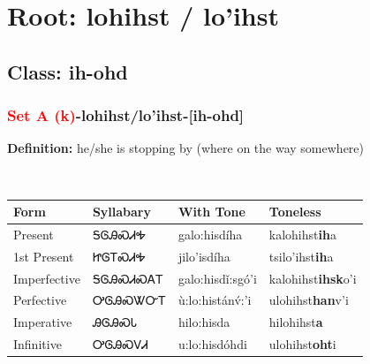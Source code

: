 \needspace{4in}
\section*{Root: lohihst / lo'ihst}
\nopagebreak
{}
\needspace{3in}
\subsection*{Class: ih-ohd}
\nopagebreak
\needspace{2in}
\subsubsection*{\textcolor{Red}{Set A (k)}{-}\textbf{lohihst/lo'ihst}{-}[ih-ohd]}
\nopagebreak
\textbf{Definition: } he/she is stopping by (where on the way somewhere)
\\[0.5em]
\begin{tabularx}{\textwidth}{l X X X}%
\toprule%
\textbf{Form}&\textbf{Syllabary}&\textbf{With Tone}&\textbf{Toneless}\\%
\midrule%
Present&ᎦᎶᎯᏍᏗᎭ&galo:hisdíha&kalohihst\textbf{ih}a\\%
1st Present&ᏥᎶᎢᏍᏗᎭ&jilo’isdíha&tsilo'ihst\textbf{ih}a\\%
Imperfective&ᎦᎶᎯᏍᏗᏍᎪᎢ&galo:hisdǐ:sgó’i&kalohihst\textbf{ihsk}o'i\\%
Perfective&ᎤᎶᎯᏍᏔᏅᎢ&ù:lo:histánv́:’i&ulohihst\textbf{han}v'i\\%
Imperative&ᎯᎶᎯᏍᏓ&hilo:hisda&hilohihst\textbf{a}\\%
Infinitive&ᎤᎶᎯᏍᏙᏗ&u:lo:hisdóhdi&ulohihst\textbf{oht}i\\%
\bottomrule%
\end{tabularx}
\\[1em]